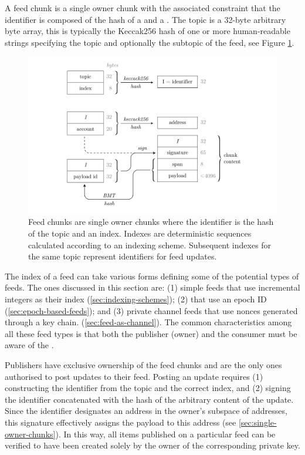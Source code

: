 A feed chunk is a single owner chunk with the associated constraint that the identifier is composed of the hash of a  and a . The topic is a 32-byte arbitrary byte array, this is typically the Keccak256 hash of one or more human-readable strings specifying the topic and optionally the subtopic of the feed, see Figure \ref{fig:feed-chunk}. 


\begin{figure}[htbp]
\centering
\includegraphics[width=\textwidth]{fig/feed-chunk.pdf}
\caption[Feed chunk \statusgreen]{Feed chunks are single owner chunks where the identifier is the hash of the topic and an index. Indexes are deterministic sequences calculated according to an indexing scheme. Subsequent indexes for the same topic represent identifiers for feed updates.}
\label{fig:feed-chunk}
\end{figure}

The index of a feed can take various forms defining some of the potential types of feeds. The ones discussed in this section are: (1) simple feeds that use incremental integers as their index (\ref{sec:indexing-schemes}); (2)   that use an epoch ID (\ref{sec:epoch-based-feeds}); and (3) private channel feeds that use nonces generated through a  key chain.  (\ref{sec:feed-as-channel}).
The common characteristics among all these feed types is that both the publisher (owner) and the consumer must be aware of the . 

Publishers have exclusive ownership of the feed chunks and are the only ones authorised to post updates to their feed. Posting an update requires (1) constructing the identifier from the topic and the correct index, and (2) signing the identifier concatenated with the hash of the arbitrary content of the update. Since the identifier designates an address in the owner's subspace of addresses, this signature effectively assigns the payload to this address (see \ref{sec:single-owner-chunks}). In this way, all items published on a particular feed can be verified to have been created solely by the owner of the corresponding private key.

